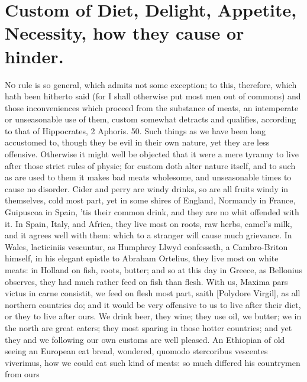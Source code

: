 {{%
\section{Custom of Diet, Delight, Appetite, Necessity, how they cause or hinder.}

\lettrine{N}{o} rule is so general, which admits not some exception; to this,
therefore, which hath been hitherto said (for I shall otherwise put
most men out of commons) and those inconveniences which proceed from
the substance of meats, an intemperate or unseasonable use of them,
custom somewhat detracts and qualifies, according to that of
Hippocrates, 2 Aphoris. 50.  Such things as we have been long
accustomed to, though they be evil in their own nature, yet they are
less offensive. Otherwise it might well be objected that it were a mere
tyranny to live after those strict rules of physic; for custom
doth alter nature itself, and to such as are used to them it
makes bad meats wholesome, and unseasonable times to cause no disorder.
Cider and perry are windy drinks, so are all fruits windy in
themselves, cold most part, yet in some shires of England,
Normandy in France, Guipuscoa in Spain, 'tis their common drink, and
they are no whit offended with it. In Spain, Italy, and Africa, they
live most on roots, raw herbs, camel's milk, and it agrees well
with them: which to a stranger will cause much grievance. In Wales,
lacticiniis vescuntur, as Humphrey Llwyd confesseth, a Cambro-Briton
himself, in his elegant epistle to Abraham Ortelius, they live most on
white meats: in Holland on fish, roots, butter; and so at this
day in Greece, as Bellonius observes, they had much rather feed
on fish than flesh. With us, Maxima pars victus in carne consistit, we
feed on flesh most part, saith [Polydore Virgil], as all northern
countries do; and it would be very offensive to us to live after their
diet, or they to live after ours. We drink beer, they wine; they use
oil, we butter; we in the north are great eaters; they most
sparing in those hotter countries; and yet they and we following our
own customs are well pleased. An Ethiopian of old seeing an European
eat bread, wondered, quomodo stercoribus vescentes viverimus, how we
could eat such kind of meats: so much differed his countrymen from ours
}}
